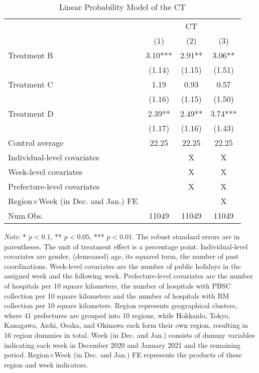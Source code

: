 \documentclass[12pt, a4paper]{article}
\begin{document}
\begin{table}[H]

\caption{\label{tab:test-lm}Linear Probability Model of the CT}
\centering
\fontsize{8}{10}\selectfont
\begin{threeparttable}
\begin{tabular}[t]{lccc}
\toprule
\multicolumn{1}{c}{ } & \multicolumn{3}{c}{CT} \\
\cmidrule(l{3pt}r{3pt}){2-4}
  & (1) & (2) & (3)\\
\midrule
Treatment B & \num{3.10}*** & \num{2.91}** & \num{3.06}**\\
 & (\num{1.14}) & (\num{1.15}) & (\num{1.51})\\
Treatment C & \num{1.19} & \num{0.93} & \num{0.57}\\
 & (\num{1.16}) & (\num{1.15}) & (\num{1.50})\\
Treatment D & \num{2.39}** & \num{2.49}** & \num{3.74}***\\
 & (\num{1.17}) & (\num{1.16}) & (\num{1.43})\\
\midrule
Control average & 22.25 & 22.25 & 22.25\\
Individual-level covariates &  & X & X\\
Week-level covariates &  & X & X\\
Prefecture-level covariates &  & X & X\\
Region$\times$Week (in Dec. and Jan.) FE &  &  & X\\
Num.Obs. & \num{11049} & \num{11049} & \num{11049}\\
\bottomrule
\end{tabular}
\begin{tablenotes}
\item \emph{Note}: * $p < 0.1$, ** $p < 0.05$, *** $p < 0.01$. The robust standard errors are in parentheses. The unit of treatment effect is a percentage point. Individual-level covariates are gender, (demeaned) age, its squared term, the number of past coordinations. Week-level covariates are the number of public holidays in the assigned week and the following week. Prefecture-level covariates are the number of hospitals per 10 square kilometers, the number of hospitals with PBSC collection per 10 square kilometers and the number of hospitals with BM collection per 10 square kilometers. Region represents geographical clusters, where 41 prefectures are grouped into 10 regions, while Hokkaido, Tokyo, Kanagawa, Aichi, Osaka, and Okinawa each form their own region, resulting in 16 region dummies in total. Week (in Dec. and Jan.) consists of dummy variables indicating each week in December 2020 and January 2021 and the remaining period. Region$\times$Week (in Dec. and Jan.) FE represents the products of these region and week indicators.
\end{tablenotes}
\end{threeparttable}
\end{table}
\end{document}
